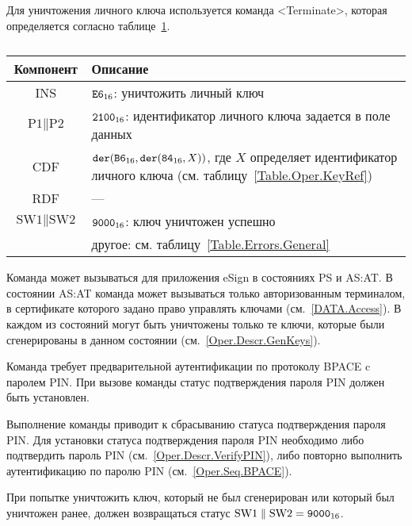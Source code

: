 Для уничтожения личного ключа используется команда <Terminate>,
которая определяется согласно 
таблице~\ref{Table.Oper.TerminateCmd}.

\begin{table}[ht]
\caption{}\label{Table.Oper.TerminateCmd}
\begin{tabular}{|c|p{14cm}|}
\hline
Компонент & Описание\\
\hline
\hline
INS & $\texttt{E6}_{16}$: уничтожить личный ключ \\
\hline
$\text{P1} \parallel\text{P2}$ & $\texttt{2100}_{16}$:
идентификатор личного ключа задается в поле данных\\
\hline
CDF &  $\texttt{der}(\texttt{B6}_{16},\texttt{der}(\texttt{84}_{16}, X))$,
где $X$ определяет идентификатор личного ключа
(см. таблицу~\ref{Table.Oper.KeyRef})\\ 
\hline 
RDF & ---  \\
\hline
$\text{SW1} \parallel \text{SW2}$ & 
$\texttt{9000}_{16}$: ключ уничтожен успешно\\
 & другое: см. таблицу~\ref{Table.Errors.General} \\
\hline
\end{tabular}
\end{table}

Команда может вызываться для приложения eSign в состояниях PS и AS:AT.
В состоянии AS:AT команда может вызываться только
авторизованным терминалом, в сертификате которого задано право
управлять ключами (см.~\ref{DATA.Access}).
В каждом из состояний могут быть уничтожены только те ключи, которые
были сгенерированы в данном состоянии (см.~\ref{Oper.Descr.GenKeys}).

Команда требует предварительной аутентификации по протоколу BPACE
c паролем PIN. При вызове команды статус подтверждения пароля PIN 
должен быть установлен.

Выполнение команды приводит к сбрасыванию статуса подтверждения пароля PIN.
Для установки статуса подтверждения пароля PIN 
необходимо либо подтвердить пароль PIN (см.~\ref{Oper.Descr.VerifyPIN}), 
либо повторно выполнить аутентификацию по паролю PIN (см.~\ref{Oper.Seq.BPACE}).

При попытке уничтожить ключ, который не был сгенерирован
или который был уничтожен ранее, должен возвращаться 
статус $\text{SW1} \parallel \text{SW2} = \texttt{9000}_{16}$.
